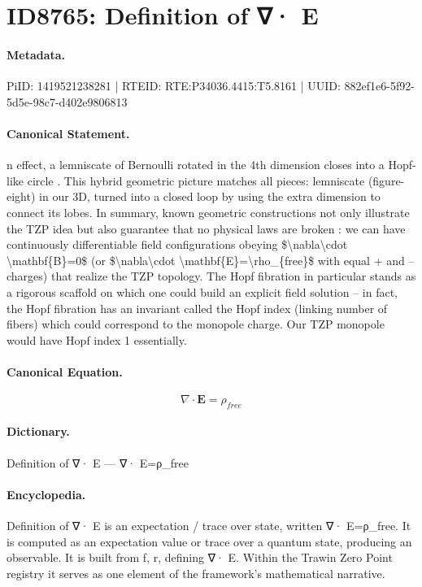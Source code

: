 \section*{ID8765: Definition of ∇· E}
\paragraph{Metadata.}
PiID: 1419521238281 | RTEID: RTE:P34036.4415:T5.8161 | UUID: 882ef1e6-5f92-5d5e-98c7-d402e9806813

\paragraph{Canonical Statement.}
n effect, a lemniscate of Bernoulli rotated in the 4th dimension closes into a Hopf-like circle . This hybrid geometric picture matches all pieces: lemniscate (figure-eight) in our 3D, turned into a closed loop by using the extra dimension to connect its lobes. In summary, known geometric constructions not only illustrate the TZP idea but also guarantee that no physical laws are broken : we can have continuously differentiable field configurations obeying \$\textbackslash{}nabla\textbackslash{}cdot \textbackslash{}mathbf\{B\}=0\$ (or \$\textbackslash{}nabla\textbackslash{}cdot \textbackslash{}mathbf\{E\}=\textbackslash{}rho\_\{free\}\$ with equal + and – charges) that realize the TZP topology. The Hopf fibration in particular stands as a rigorous scaffold on which one could build an explicit field solution – in fact, the Hopf fibration has an invariant called the Hopf index (linking number of fibers) which could correspond to the monopole charge. Our TZP monopole would have Hopf index 1 essentially.

\paragraph{Canonical Equation.}
\[
\nabla\cdot \mathbf{E}=\rho_{free}
\]

\paragraph{Dictionary.}
Definition of ∇· E — ∇· E=ρ\_free

\paragraph{Encyclopedia.}
Definition of ∇· E is an expectation / trace over state, written ∇· E=ρ\_free. It is computed as an expectation value or trace over a quantum state, producing an observable. It is built from f, r, defining ∇· E. Within the Trawin Zero Point registry it serves as one element of the framework's mathematical narrative.
